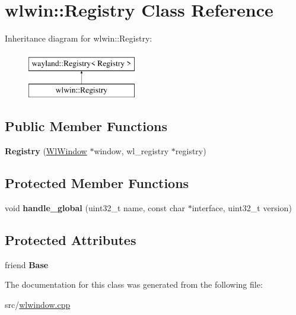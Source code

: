 \hypertarget{classwlwin_1_1Registry}{}\section{wlwin\+::Registry Class Reference}
\label{classwlwin_1_1Registry}
Inheritance diagram for wlwin\+::Registry\+:\begin{figure}[H]
\begin{center}
\leavevmode
\includegraphics[height=2.000000cm]{classwlwin_1_1Registry}
\end{center}
\end{figure}
\subsection*{Public Member Functions}
\begin{DoxyCompactItemize}
\item 
\mbox{\label{classwlwin_1_1Registry_a0195d050eccc860fff7f1c0c2e612e2c}} 
{\bfseries Registry} (\mbox{\hyperlink{classwlwin_1_1WlWindow}{Wl\+Window}} $\ast$window, wl\+\_\+registry $\ast$registry)
\end{DoxyCompactItemize}
\subsection*{Protected Member Functions}
\begin{DoxyCompactItemize}
\item 
\mbox{\label{classwlwin_1_1Registry_a7872dff6d194a76e404ee82cfe4e7eb9}} 
void {\bfseries handle\+\_\+global} (uint32\+\_\+t name, const char $\ast$interface, uint32\+\_\+t version)
\end{DoxyCompactItemize}
\subsection*{Protected Attributes}
\begin{DoxyCompactItemize}
\item 
\mbox{\label{classwlwin_1_1Registry_a6bf8b4a64e011a85d297510c7975f823}} 
friend {\bfseries Base}
\end{DoxyCompactItemize}


The documentation for this class was generated from the following file\+:\begin{DoxyCompactItemize}
\item 
src/\mbox{\hyperlink{wlwindow_8cpp}{wlwindow.\+cpp}}\end{DoxyCompactItemize}
